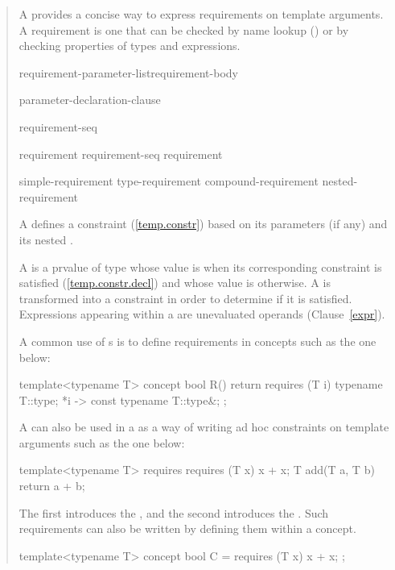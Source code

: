 \begin{quote}

\pnum
A  provides a concise way to express 
requirements on template arguments. 
% 
A requirement is one that can be checked by name lookup
() or by checking properties of types and expressions.

\begin{bnf}
\br
     requirement-parameter-list\opt requirement-body

\br
    \terminal{(} parameter-declaration-clause\opt~\terminal{)}
  
\br
    \terminal{\{} requirement-seq \terminal{\}}

\br
    requirement\br
    requirement-seq requirement

\br
    simple-requirement\br
    type-requirement\br
    compound-requirement\br
    nested-requirement
\end{bnf}

\pnum
A  defines a constraint (\ref{temp.constr})
based on its parameters (if any) and its nested .

\pnum
A  is a prvalue of type  whose
value is  when its corresponding constraint is satisfied
(\ref{temp.constr.decl}) and whose value is  otherwise.
\enternote
A  is transformed into a constraint 
in order to determine if it is satisfied.
\exitnote
Expressions appearing within a 
are unevaluated operands (Clause~\ref{expr}).

\pnum
\enterexample
A common use of s is to define
requirements in concepts such as the one below:
\begin{codeblock}
template<typename T>
  concept bool R() {
    return requires (T i) {
      typename T::type;
      {*i} -> const typename T::type&;
    };
  }
\end{codeblock}
A  can also be used in a 
 as a way of writing ad hoc 
constraints on template arguments such as the one below:
\begin{codeblock}
template<typename T>
  requires requires (T x) { x + x; }
    T add(T a, T b) { return a + b; }
\end{codeblock}
The first  introduces the 
, and the second
introduces the .
\exitexample
\enternote
Such requirements can also be written by defining them within
a concept.
\begin{codeblock}
template<typename T>
  concept bool C = requires (T x) { x + x; };


\end{codeblock}
\end{quote}
